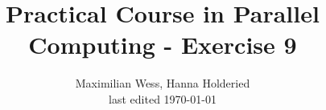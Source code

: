 \documentclass[12pt]{scrartcl}
\begin{document}
 
 

\pagestyle{scrheadings}
\clearscrheadfoot
{}
 
\title{Practical Course in Parallel Computing - Exercise 9}%
\author{Maximilian Wess, Hanna Holderied\\
\tiny{last edited \today}}
\date{}

\maketitle
\end{document}
